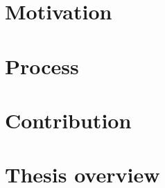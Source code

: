 
\section{Motivation}
\label{ch:intro/motiv}


\section{Process}
\label{ch:intro/process}


\section{Contribution}
\label{ch:intro/contri}


\newpage

\section{Thesis overview}
\label{ch:intro/overview}

